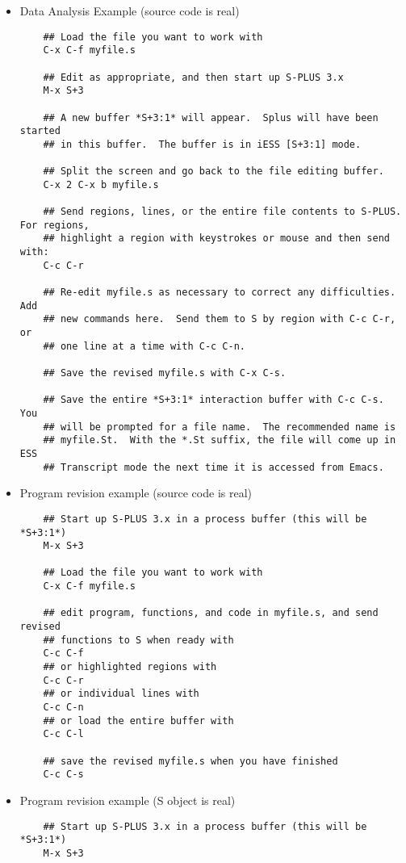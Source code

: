 \documentclass{article}
\begin{document}
\begin{itemize}
\item Data Analysis Example (source code is real)
\begin{verbatim}
    ## Load the file you want to work with
    C-x C-f myfile.s

    ## Edit as appropriate, and then start up S-PLUS 3.x
    M-x S+3

    ## A new buffer *S+3:1* will appear.  Splus will have been started
    ## in this buffer.  The buffer is in iESS [S+3:1] mode.

    ## Split the screen and go back to the file editing buffer.
    C-x 2 C-x b myfile.s

    ## Send regions, lines, or the entire file contents to S-PLUS.  For regions,
    ## highlight a region with keystrokes or mouse and then send with:
    C-c C-r

    ## Re-edit myfile.s as necessary to correct any difficulties.  Add
    ## new commands here.  Send them to S by region with C-c C-r, or
    ## one line at a time with C-c C-n.

    ## Save the revised myfile.s with C-x C-s.

    ## Save the entire *S+3:1* interaction buffer with C-c C-s.  You
    ## will be prompted for a file name.  The recommended name is
    ## myfile.St.  With the *.St suffix, the file will come up in ESS
    ## Transcript mode the next time it is accessed from Emacs.
\end{verbatim}
\item Program revision example (source code is real)
\begin{verbatim}
    ## Start up S-PLUS 3.x in a process buffer (this will be *S+3:1*) 
    M-x S+3

    ## Load the file you want to work with
    C-x C-f myfile.s
    
    ## edit program, functions, and code in myfile.s, and send revised
    ## functions to S when ready with
    C-c C-f
    ## or highlighted regions with
    C-c C-r
    ## or individual lines with
    C-c C-n
    ## or load the entire buffer with 
    C-c C-l

    ## save the revised myfile.s when you have finished
    C-c C-s
\end{verbatim}
\item Program revision example (S object is real)
\begin{verbatim}
    ## Start up S-PLUS 3.x in a process buffer (this will be *S+3:1*) 
    M-x S+3


\end{verbatim}
\end{itemize}
\end{document}
